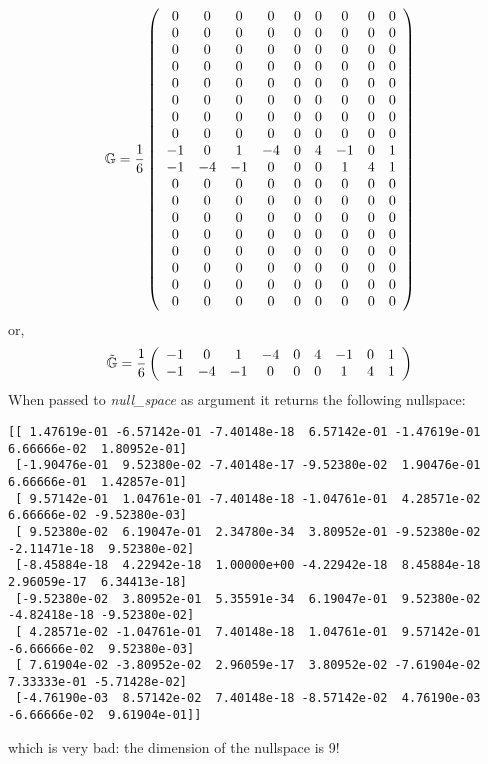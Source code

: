 \[
{\mathbb{G}}=
\frac{1}{6}
\left(
\begin{array}{ccccccccc}
  0  &   0 &   0 &   0 &   0 &    0 &   0 &   0 &   0 \\ 
  0  &   0 &   0 &   0 &   0 &    0 &   0 &   0 &   0 \\ 
  0  &   0 &   0 &   0 &   0 &    0 &   0 &   0 &   0 \\ 
  0  &   0 &   0 &   0 &   0 &    0 &   0 &   0 &   0 \\ 
  0  &   0 &   0 &   0 &   0 &    0 &   0 &   0 &   0 \\ 
  0  &   0 &   0 &   0 &   0 &    0 &   0 &   0 &   0 \\ 
  0  &   0 &   0 &   0 &   0 &    0 &   0 &   0 &   0 \\ 
  0  &   0 &   0 &   0 &   0 &    0 &   0 &   0 &   0 \\ 
 -1  &   0 &   1 &  -4 &   0 &    4 &  -1 &   0 &   1 \\ 
 -1  &  -4 &  -1 &   0 &   0 &    0 &   1 &   4 &   1 \\ 
  0  &   0 &   0 &   0 &   0 &    0 &   0 &   0 &   0 \\ 
  0  &   0 &   0 &   0 &   0 &    0 &   0 &   0 &   0 \\ 
  0  &   0 &   0 &   0 &   0 &    0 &   0 &   0 &   0 \\ 
  0  &   0 &   0 &   0 &   0 &    0 &   0 &   0 &   0 \\ 
  0  &   0 &   0 &   0 &   0 &    0 &   0 &   0 &   0 \\ 
  0  &   0 &   0 &   0 &   0 &    0 &   0 &   0 &   0 \\ 
  0  &   0 &   0 &   0 &   0 &    0 &   0 &   0 &   0 \\ 
  0  &   0 &   0 &   0 &   0 &    0 &   0 &   0 &   0 
\end{array}
\right)
\]
or,
\[
\tilde{{\mathbb{G}}}=
\frac{1}{6}
\left(
\begin{array}{ccccccccc}
 -1  &   0 &   1 &  -4 &   0 &    4 &  -1 &   0 &   1 \\ 
 -1  &  -4 &  -1 &   0 &   0 &    0 &   1 &   4 &   1 
\end{array}
\right)
\]
When passed to {\sl null\_space} as argument it returns the following nullspace:
\begin{verbatim}
[[ 1.47619e-01 -6.57142e-01 -7.40148e-18  6.57142e-01 -1.47619e-01  6.66666e-02  1.80952e-01]
 [-1.90476e-01  9.52380e-02 -7.40148e-17 -9.52380e-02  1.90476e-01  6.66666e-01  1.42857e-01]
 [ 9.57142e-01  1.04761e-01 -7.40148e-18 -1.04761e-01  4.28571e-02  6.66666e-02 -9.52380e-03]
 [ 9.52380e-02  6.19047e-01  2.34780e-34  3.80952e-01 -9.52380e-02 -2.11471e-18  9.52380e-02]
 [-8.45884e-18  4.22942e-18  1.00000e+00 -4.22942e-18  8.45884e-18  2.96059e-17  6.34413e-18]
 [-9.52380e-02  3.80952e-01  5.35591e-34  6.19047e-01  9.52380e-02 -4.82418e-18 -9.52380e-02]
 [ 4.28571e-02 -1.04761e-01  7.40148e-18  1.04761e-01  9.57142e-01 -6.66666e-02  9.52380e-03]
 [ 7.61904e-02 -3.80952e-02  2.96059e-17  3.80952e-02 -7.61904e-02  7.33333e-01 -5.71428e-02]
 [-4.76190e-03  8.57142e-02  7.40148e-18 -8.57142e-02  4.76190e-03 -6.66666e-02  9.61904e-01]]
\end{verbatim}
which is very bad: the dimension of the nullspace is 9!

